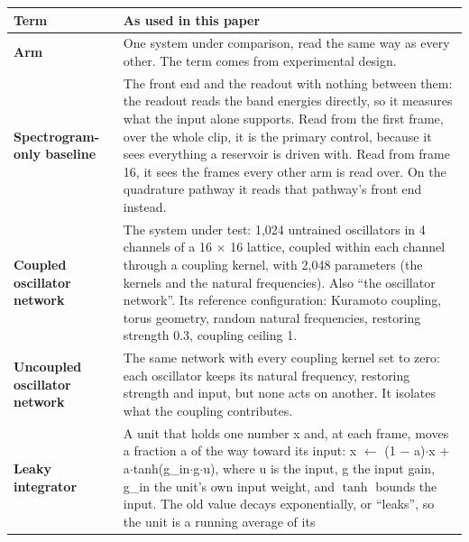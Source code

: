 \documentclass{article}
\begin{document}
{\def\LTcaptype{none} %
\begin{longtable}[]{@{}
  >{\raggedright\arraybackslash}p{}
  >{\raggedright\arraybackslash}p{}@{}}
\toprule\noalign{}
\begin{minipage}[b]{\linewidth}\raggedright
Term
\end{minipage} & \begin{minipage}[b]{\linewidth}\raggedright
As used in this paper
\end{minipage} \\
\midrule\noalign{}
\endhead
\bottomrule\noalign{}
\endlastfoot
\textbf{Arm} & One system under comparison, read the same way as every
other. The term comes from experimental design. \\
\cmidrule{1-2}\textbf{Spectrogram-only baseline} & The front end and the
readout with nothing between them: the readout reads the band energies
directly, so it measures what the input alone supports. Read from the
first frame, over the whole clip, it is the primary control, because it
sees everything a reservoir is driven with. Read from frame 16, it sees
the frames every other arm is read over. On the quadrature pathway it
reads that pathway's front end instead. \\
\cmidrule{1-2}\textbf{Coupled oscillator network} & The system under
test: 1,024 untrained oscillators in 4 channels of a 16
\ensuremath{\times} 16 lattice, coupled within each channel through a
coupling kernel, with 2,048 parameters (the kernels and the natural
frequencies). Also ``the oscillator network''. Its reference
configuration: Kuramoto coupling, torus geometry, random natural
frequencies, restoring strength 0.3, coupling ceiling 1. \\
\cmidrule{1-2}\textbf{Uncoupled oscillator network} & The same network
with every coupling kernel set to zero: each oscillator keeps its
natural frequency, restoring strength and input, but none acts on
another. It isolates what the coupling contributes. \\
\cmidrule{1-2}\textbf{Leaky integrator} & A unit that holds one number x
and, at each frame, moves a fraction a of the way toward its input: x
\ensuremath{\leftarrow} (1 \ensuremath{-} a)\ensuremath{\cdot}x +
a\ensuremath{\cdot}tanh(g\_in\ensuremath{\cdot}g\ensuremath{\cdot}u),
where u is the input, g the input gain, g\_in the unit's own input
weight, and \(\tanh\) bounds the input. The old value decays
exponentially, or ``leaks'', so the unit is a running average of its

\end{longtable}}
\end{document}
